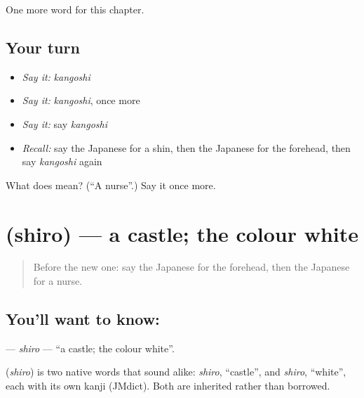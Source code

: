\begin{grammarlens}[title={What you've built}]
One more word for this chapter.
\end{grammarlens}

\subsection*{Your turn}
\begin{itemize}
\raggedright
  \item \emph{Say it:} \emph{kangoshi}
  \item \emph{Say it:} \emph{kangoshi}, once more
  \item \emph{Say it:} say \emph{kangoshi}
  \item \emph{Recall:} say the Japanese for a shin, then the Japanese for the forehead, then say \emph{kangoshi} again
\end{itemize}

\begin{tcolorbox}[breakable,colback=teal!4,colframe=teal!35!black,title={Before you move on}]
What does  mean? (\textquotedblleft{}A nurse\textquotedblright{}.) Say it once more.
\end{tcolorbox}
\section[\texorpdfstring{\ja{しろ} (shiro)}{しろ (shiro)}]{ (shiro) — a castle; the colour white}

\label{lesson:JA-C111-shiro}



\begin{quote}
Before the new one: say the Japanese for the forehead, then the Japanese for a nurse.
\end{quote}

\subsection*{You'll want to know: }
\textbf{} — \emph{shiro} — \textquotedblleft{}a castle; the colour white\textquotedblright{}.

\begin{cousinweb}
\textbf{} (\emph{shiro}) is two native words that sound alike: \emph{shiro}, \textquotedblleft{}castle\textquotedblright{}, and \emph{shiro}, \textquotedblleft{}white\textquotedblright{}, each with its own kanji (JMdict). Both are inherited rather than borrowed.
\end{cousinweb}

